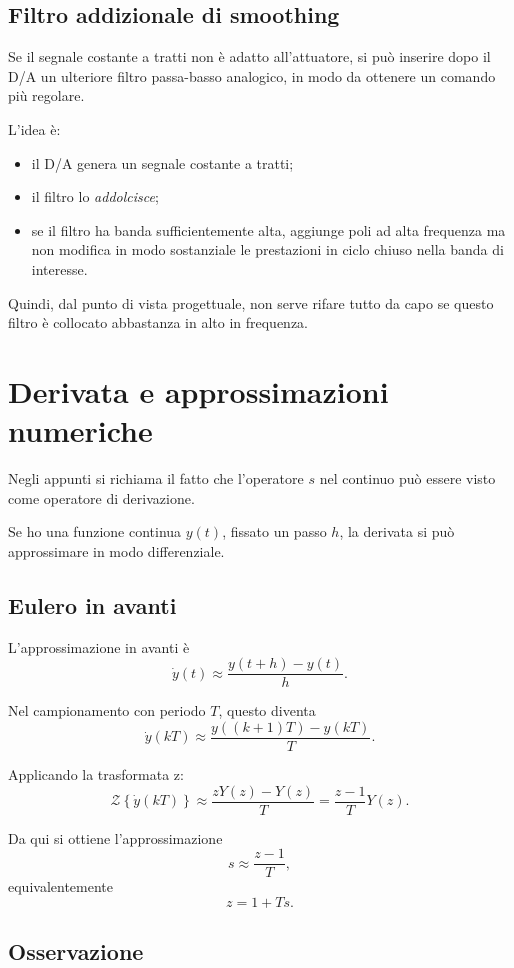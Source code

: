 \subsection*{Filtro addizionale di smoothing}

Se il segnale costante a tratti non \`e adatto all'attuatore,
si pu\`o inserire dopo il D/A un ulteriore filtro passa-basso analogico,
in modo da ottenere un comando pi\`u regolare.

L'idea \`e:
\begin{itemize}
    \item il D/A genera un segnale costante a tratti;
    \item il filtro lo \emph{addolcisce};
    \item se il filtro ha banda sufficientemente alta, aggiunge poli ad alta frequenza
    ma non modifica in modo sostanziale le prestazioni in ciclo chiuso nella banda di interesse.
\end{itemize}

Quindi, dal punto di vista progettuale, non serve rifare tutto da capo
se questo filtro \`e collocato abbastanza in alto in frequenza.

\section{Derivata e approssimazioni numeriche}

Negli appunti si richiama il fatto che l'operatore \(s\) nel continuo
pu\`o essere visto come operatore di derivazione.

Se ho una funzione continua \(y(t)\), fissato un passo \(h\),
la derivata si pu\`o approssimare in modo differenziale.

\subsection{Eulero in avanti}

L'approssimazione in avanti \`e
\[
\dot y(t)\approx \frac{y(t+h)-y(t)}{h}.
\]

Nel campionamento con periodo \(T\), questo diventa
\[
\dot y(kT)\approx \frac{y((k+1)T)-y(kT)}{T}.
\]

Applicando la trasformata z:
\[
\mathcal{Z}\left\{\dot y(kT)\right\}
\approx
\frac{zY(z)-Y(z)}{T}
=
\frac{z-1}{T}Y(z).
\]

Da qui si ottiene l'approssimazione
\[
s \approx \frac{z-1}{T},
\]
equivalentemente
\[
z=1+Ts.
\]

\subsection{Osservazione}


